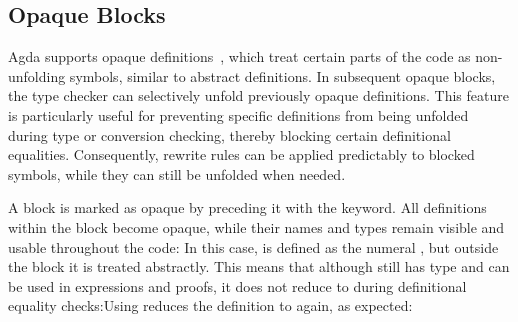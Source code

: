 \documentclass[screen,nonacm]{acmart}
\begin{document}
\subsection*{Opaque Blocks}
Agda supports opaque definitions~\cite{gratzer2022controlling}, which treat
certain parts of the code as non-unfolding symbols, similar to abstract
definitions. In subsequent opaque blocks, the type checker can selectively
unfold previously opaque definitions. This feature is particularly useful for
preventing specific definitions from being unfolded during type or conversion
checking, thereby blocking certain definitional equalities. Consequently,
rewrite rules can be applied predictably to blocked symbols, while they can
still be unfolded when needed.

A block is marked as opaque by preceding it with the 
keyword. All definitions within the block become opaque, while their names and
types remain visible and usable throughout the code: \EOpaque{}In this case,
 is defined as the numeral , but outside
the block it is treated abstractly. This means that although
 still has type  and can be used in
expressions and proofs, it does not reduce to  during
definitional equality checks:\EOpaqueExO{}Using  reduces
the definition to  again, as expected: \EOpaqueExT{}
\end{document}
